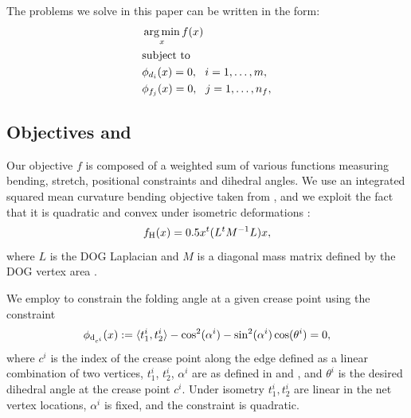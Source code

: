 The problems we solve in this paper can be written in the form:
\begin{equation} \label{eq:const_opt}
\begin{aligned}
& \operatorname*{arg\,min}_x f(x) \\
& \textrm{subject to} \\
& \phi_{d_i}(x) = 0, \ \  i = 1, \ldots, m, \\
& \phi_{f_j}(x) = 0, \ \  j = 1, \ldots, n_f, \\ 
\end{aligned}
\end{equation}

\subsection{Objectives and } \label{sec:dog_obj}
Our objective $f$ is composed of a weighted sum of various functions measuring bending, stretch, positional constraints and dihedral angles.
We use an integrated squared mean curvature bending objective taken from \cite{rabi2018shape}, and we exploit the fact that it is quadratic and convex under isometric deformations \cite{quadratic_bending}:
\begin{equation}
f_\text{H}(x) = 0.5x^t(L^tM^{-1}L)x,
\end{equation}
where $L$ is the DOG Laplacian and $M$ is a diagonal mass matrix defined by the DOG vertex area \cite{rabi2018shape}.

 We employ  to constrain the folding angle at a given crease point using the constraint
\begin{equation}
\phi_{\text{d}_{c^i}}(x) := \langle t_1^i, t_2^i \rangle - \cos^2(\alpha^i) - \sin^2(\alpha^i) \cos(\theta^i) = 0,
\end{equation}
where $c^i$ is the index of the crease point along the edge defined as a linear combination of two vertices, $t_1^i$, $t_2^i$, $\alpha^i$ are as defined in  and , and $\theta^i$ is the desired dihedral angle at the crease point $c^i$. Under isometry $t_1^i,t_2^i$ are linear in the net vertex locations, $\alpha^i$ is fixed, and the constraint is quadratic.


